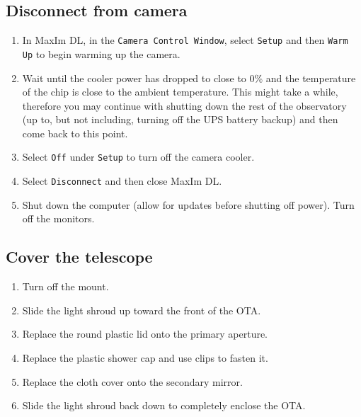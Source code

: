 \documentclass{article}
\begin{document}
	\subsection{Disconnect from camera}
		
		\begin{enumerate}
			
			\item In MaxIm DL, in the \texttt{Camera Control Window}, select \texttt{Setup} and then \texttt{Warm Up} to begin warming up the camera.
			
			\item Wait until the cooler power has dropped to close to 0\% and the temperature of the chip is close to the ambient temperature. This might take a while, therefore you may continue with shutting down the rest of the observatory (up to, but not including, turning off the UPS battery backup) and then come back to this point.
			
			\item Select \texttt{Off} under \texttt{Setup} to turn off the camera cooler.
			
			\item Select \texttt{Disconnect} and then close MaxIm DL.
			
			\item Shut down the computer (allow for updates before shutting off power). Turn off the monitors.
			
		\end{enumerate}
		
	\subsection{Cover the telescope}
		
		\begin{enumerate}
			
			\item Turn off the mount.
			
			\item Slide the light shroud up toward the front of the OTA.
			
			\item Replace the round plastic lid onto the primary aperture.
			
			\item Replace the plastic shower cap and use clips to fasten it.
			
			\item Replace the cloth cover onto the secondary mirror.
			
			\item Slide the light shroud back down to completely enclose the OTA.
			
		\end{enumerate}
		
\end{document}
